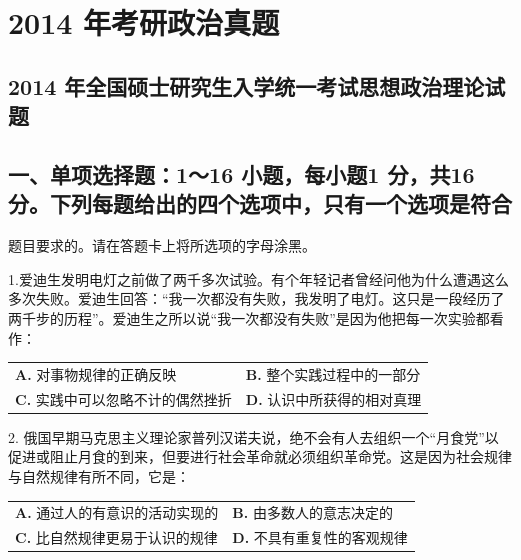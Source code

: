 \documentclass[UTF8,11pt]{ctexart}
\begin{document}
\section*{2014 年考研政治真题}
\subsection*{2014 年全国硕士研究生入学统一考试思想政治理论试题}

\subsection*{一、单项选择题：1～16 小题，每小题1 分，共16 分。下列每题给出的四个选项中，只有一个选项是符合}

题目要求的。请在答题卡上将所选项的字母涂黑。


1.爱迪生发明电灯之前做了两千多次试验。有个年轻记者曾经问他为什么遭遇这么多次失败。爱迪生回答：“我一次都没有失败，我发明了电灯。这只是一段经历了两千步的历程”。爱迪生之所以说“我一次都没有失败”是因为他把每一次实验都看作：


\begin{center}\begin{tabular}{>{\raggedright\arraybackslash}p{\dimexpr(\linewidth-4\tabcolsep)/2\relax}>{\raggedright\arraybackslash}p{\dimexpr(\linewidth-4\tabcolsep)/2\relax}}
\textbf{A.} 对事物规律的正确反映 & \textbf{B.} 整个实践过程中的一部分\\[.35em]
\textbf{C.} 实践中可以忽略不计的偶然挫折 & \textbf{D.} 认识中所获得的相对真理\\[.35em]\end{tabular}\end{center}

2. 俄国早期马克思主义理论家普列汉诺夫说，绝不会有人去组织一个“月食党”以促进或阻止月食的到来，但要进行社会革命就必须组织革命党。这是因为社会规律与自然规律有所不同，它是：


\begin{center}\begin{tabular}{>{\raggedright\arraybackslash}p{\dimexpr(\linewidth-4\tabcolsep)/2\relax}>{\raggedright\arraybackslash}p{\dimexpr(\linewidth-4\tabcolsep)/2\relax}}
\textbf{A.} 通过人的有意识的活动实现的 & \textbf{B.} 由多数人的意志决定的\\[.35em]
\textbf{C.} 比自然规律更易于认识的规律 & \textbf{D.} 不具有重复性的客观规律\\[.35em]\end{tabular}\end{center}
\end{document}
